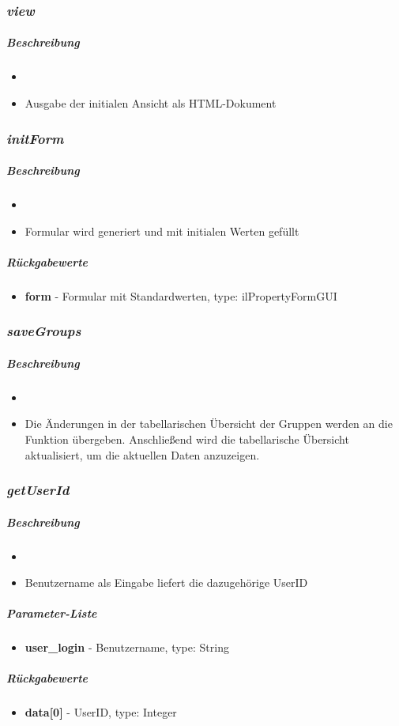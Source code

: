 \subsubsection*{\textit{view}}\label{viewGDGUI}
\subparagraph{Beschreibung}
\begin{itemize}
	\item[] \noindent{}
	\item[] Ausgabe der initialen Ansicht als HTML-Dokument
\end{itemize}

\subsubsection*{\textit{initForm}}\label{initFormGDGUI}
\subparagraph{Beschreibung}
\begin{itemize}
	\item[] \noindent{}
	\item[] Formular wird generiert und mit initialen Werten gefüllt
\end{itemize}
\subparagraph{Rückgabewerte}
\begin{itemize}
	\item[] \textbf{form} - Formular mit Standardwerten, type: ilPropertyFormGUI
\end{itemize}

\subsubsection*{\textit{saveGroups}}\label{saveGroupsGDGUI}
\subparagraph{Beschreibung}
\begin{itemize}
	\item[]  \noindent{} 
	\item[] Die Änderungen in der tabellarischen Übersicht der Gruppen werden an die Funktion  übergeben. Anschließend wird die tabellarische Übersicht aktualisiert, um die aktuellen Daten anzuzeigen.
\end{itemize}

\subsubsection*{\textit{getUserId}}\label{getUserIdGDGUI}
\subparagraph{Beschreibung}
\begin{itemize}
	\item[]  \noindent{} 
	\item[] Benutzername als Eingabe liefert die dazugehörige UserID
\end{itemize}
\subparagraph{Parameter-Liste}
\begin{itemize}
	\item[] \textbf{user\_login} - Benutzername, type: String
\end{itemize}
\subparagraph{Rückgabewerte}
\begin{itemize}
	\item[] \textbf{data[0]} - UserID, type: Integer
\end{itemize}

